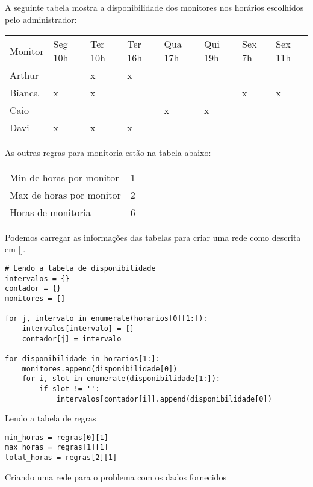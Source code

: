 \documentclass[11pt]{article}
\begin{document}
A seguinte tabela mostra a disponibilidade dos monitores nos horários
escolhidos pelo administrador:

\begin{center}
\begin{tabular}{llllllll}
Monitor & Seg 10h & Ter 10h & Ter 16h & Qua 17h & Qui 19h & Sex 7h & Sex 11h\\
Arthur &  & x & x &  &  &  & \\
Bianca & x & x &  &  &  & x & x\\
Caio &  &  &  & x & x &  & \\
Davi & x & x & x &  &  &  & \\
\end{tabular}
\end{center}

As outras regras para monitoria estão na tabela abaixo:

\begin{center}
\begin{tabular}{lr}
Min de horas por monitor & 1\\
Max de horas por monitor & 2\\
Horas de monitoria & 6\\
\end{tabular}
\end{center}

Podemos carregar as informações das tabelas para criar uma rede como
descrita em [].
\begin{verbatim}
# Lendo a tabela de disponibilidade
intervalos = {}
contador = {}
monitores = []

for j, intervalo in enumerate(horarios[0][1:]):
    intervalos[intervalo] = []
    contador[j] = intervalo

for disponibilidade in horarios[1:]:
    monitores.append(disponibilidade[0])
    for i, slot in enumerate(disponibilidade[1:]):
        if slot != '':
            intervalos[contador[i]].append(disponibilidade[0])
\end{verbatim}

Lendo a tabela de regras
\begin{verbatim}
min_horas = regras[0][1]
max_horas = regras[1][1]
total_horas = regras[2][1]
\end{verbatim}

Criando uma rede para o problema com os dados fornecidos
\end{document}
